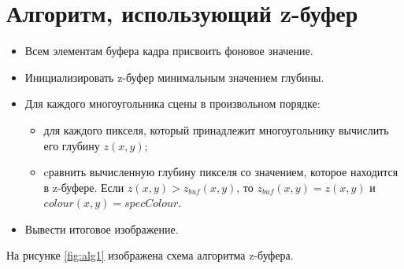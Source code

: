\documentclass[a4paper,14pt, unknownkeysallowed]{extreport}
\begin{document}
\section{Алгоритм, использующий z-буфер}

\begin{itemize}
	\item Всем элементам буфера кадра присвоить фоновое значение.
	\item Инициализировать z-буфер минимальным значением глубины.
	\item Для каждого многоугольника сцены в произвольном порядке:
	
	\begin{itemize}
		\item для каждого пикселя, который принадлежит многоугольнику вычислить его глубину $z(x, y)$;
		\item cравнить вычисленную глубину пикселя со значением, которое находится в z-буфере. Если $z(x,y) > z_{buf} (x,y)$, то $z_{buf} (x,y) = z(x,y)$ и $colour(x,y) = specColour$.
	\end{itemize}

	\item Вывести итоговое изображение.
\end{itemize}

На рисунке \ref{fig:alg1} изображена схема алгоритма z-буфера.
\end{document}
